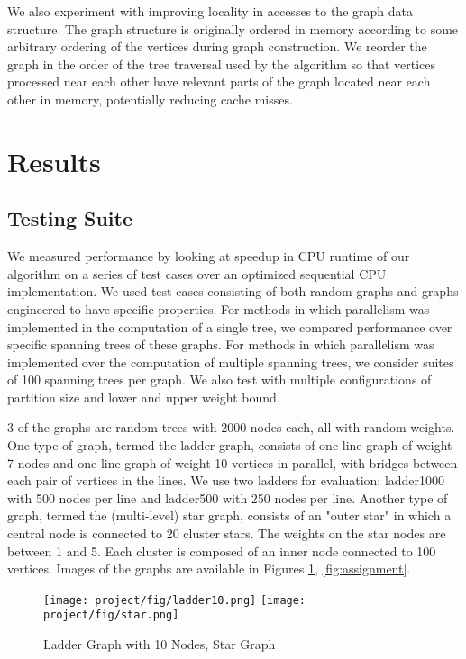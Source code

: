 \documentclass[11pt]{article}
\begin{document}
We also experiment with improving locality in accesses to the graph data structure.
The graph structure is originally ordered in memory according to some arbitrary ordering of the vertices during graph construction.
We reorder the graph in the order of the tree traversal used by the algorithm so that vertices processed near each other have relevant parts of the graph located near each other in memory, potentially reducing cache misses.

\section{Results}

\subsection{Testing Suite}

We measured performance by looking at speedup in CPU runtime of our algorithm on a series of test cases over an optimized sequential CPU implementation.
We used test cases consisting of both random graphs and graphs engineered to have specific properties.
For methods in which parallelism was implemented in the computation of a single tree, we compared performance over specific spanning trees of these graphs.
For methods in which parallelism was implemented over the computation of multiple spanning trees, we consider suites of 100 spanning trees per graph.
We also test with multiple configurations of partition size and lower and upper weight bound.

3 of the graphs are random trees with 2000 nodes each, all with random weights.
One type of graph, termed the ladder graph, consists of one line graph of weight 7 nodes and one line graph of weight 10 vertices in parallel, with bridges between each pair of vertices in the lines.
We use two ladders for evaluation: ladder1000 with 500 nodes per line and ladder500 with 250 nodes per line.
Another type of graph, termed the (multi-level) star graph, consists of an "outer star" in which a central node is connected to 20 cluster stars.
The weights on the star nodes are between 1 and 5.
Each cluster is composed of an inner node connected to 100 vertices.
Images of the graphs are available in Figures \ref{fig:ladder10}, \ref{fig:assignment}.

\begin{figure}
    \centering
    \texttt{[image: project/fig/ladder10.png]}
    \texttt{[image: project/fig/star.png]}
    \caption{Ladder Graph with 10 Nodes, Star Graph}
    \label{fig:ladder10}
\end{figure}
\end{document}
